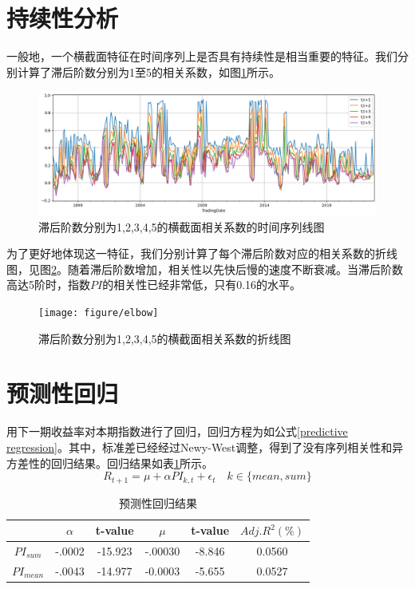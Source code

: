 \documentclass[a4paper,12pt]{report}
\begin{document}
\section{持续性分析}
一般地，一个横截面特征在时间序列上是否具有持续性是相当重要的特征。我们分别计算了滞后阶数分别为1至5的相关系数，如图\ref{fig:consistency}所示。

\begin{figure}[htbp]
	\centering
	\includegraphics[scale=0.5]{figure/consistency}
	\caption{滞后阶数分别为1,2,3,4,5的横截面相关系数的时间序列线图}
	\label{fig:consistency}
\end{figure}

为了更好地体现这一特征，我们分别计算了每个滞后阶数对应的相关系数的折线图，见图\ref{fig:elbow}。随着滞后阶数增加，相关性以先快后慢的速度不断衰减。当滞后阶数高达5阶时，指数$PI$的相关性已经非常低，只有0.16的水平。
\begin{figure}[htbp]
	\centering
	\texttt{[image: figure/elbow]}
	\caption{滞后阶数分别为1,2,3,4,5的横截面相关系数的折线图}
	\label{fig:elbow}
\end{figure}

\section{预测性回归}
用下一期收益率对本期指数进行了回归，回归方程为如公式\eqref{predictive regression}。其中，标准差已经经过Newy-West调整，得到了没有序列相关性和异方差性的回归结果。回归结果如表\ref{tab: predictive regression}所示。
\begin{equation}
	R_{t+1} = \mu + \alpha PI_{k,t}+\epsilon_t\quad k\in\{mean, sum\}
	\label{predictive regression}
\end{equation}

\begin{table}[htbp]
	\centering
	\caption{预测性回归结果}
	\label{tab: predictive regression}
	\begin{tabular}{@{}cccccc@{}}
		\toprule
  								& $\alpha$ & t-value &$\mu$ & t-value &  $Adj. R^2(\%)$\\ \midrule
		$PI_{sum}$   & -.0002   &-15.923 &	-.00030 &-8.846 & 0.0560	\\
		$PI_{mean}$ & -.0043 & -14.977 &  -0.0003 &-5.655&	0.0527  \\ \bottomrule
	\end{tabular}
\end{table}
\end{document}

